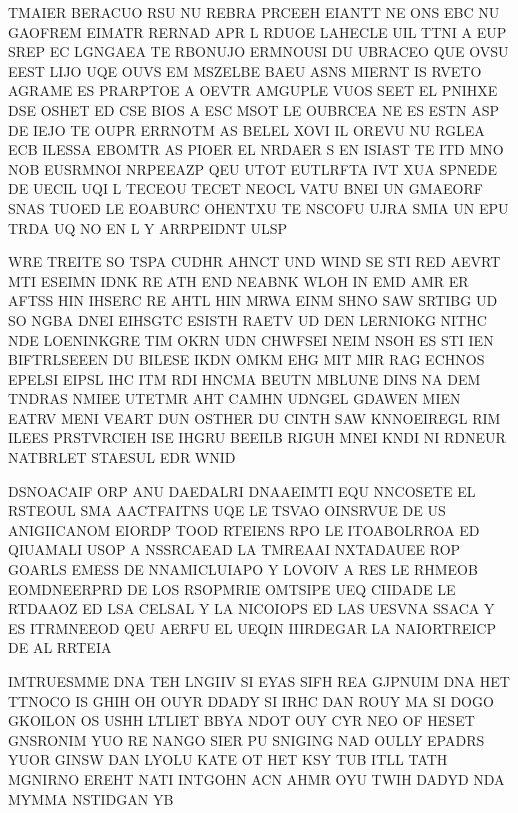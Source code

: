 \documentclass[11pt,class=report,crop=false]{standalone}
\begin{document}
\begin{activite}
\begin{enumerate}
{\small
\begin{center}
TMAIER BERACUO RSU NU REBRA PRCEEH EIANTT NE ONS EBC NU GAOFREM EIMATR RERNAD APR L RDUOE LAHECLE UIL TTNI A EUP SREP EC LGNGAEA TE RBONUJO ERMNOUSI DU UBRACEO QUE OVSU EEST LIJO UQE OUVS EM MSZELBE BAEU ASNS MIERNT IS RVETO AGRAME ES PRARPTOE A OEVTR AMGUPLE VUOS SEET EL PNIHXE DSE OSHET ED CSE BIOS A ESC MSOT LE OUBRCEA NE ES ESTN ASP DE IEJO TE OUPR ERRNOTM AS BELEL XOVI IL OREVU NU RGLEA ECB ILESSA EBOMTR AS PIOER EL NRDAER S EN ISIAST TE ITD MNO NOB EUSRMNOI NRPEEAZP QEU UTOT EUTLRFTA IVT XUA SPNEDE DE UECIL UQI L TECEOU TECET NEOCL VATU BNEI UN GMAEORF SNAS TUOED LE EOABURC OHENTXU TE NSCOFU UJRA SMIA UN EPU TRDA UQ NO EN L Y ARRPEIDNT ULSP
\end{center}

\begin{center}
WRE TREITE SO TSPA CUDHR AHNCT UND WIND SE STI RED AEVRT MTI ESEIMN IDNK RE ATH END NEABNK WLOH IN EMD AMR ER AFTSS HIN IHSERC RE AHTL HIN MRWA EINM SHNO SAW SRTIBG UD SO NGBA DNEI EIHSGTC ESISTH RAETV UD DEN LERNIOKG NITHC NDE LOENINKGRE TIM OKRN UDN CHWFSEI NEIM NSOH ES STI IEN BIFTRLSEEEN DU BILESE IKDN OMKM EHG MIT MIR RAG ECHNOS EPELSI EIPSL IHC ITM RDI HNCMA BEUTN MBLUNE DINS NA DEM TNDRAS NMIEE UTETMR AHT CAMHN UDNGEL GDAWEN MIEN EATRV MENI VEART DUN OSTHER DU CINTH SAW KNNOEIREGL RIM ILEES PRSTVRCIEH ISE IHGRU BEEILB RIGUH MNEI KNDI NI RDNEUR NATBRLET STAESUL EDR WNID
\end{center}

\begin{center}
DSNOACAIF ORP ANU DAEDALRI DNAAEIMTI EQU NNCOSETE EL RSTEOUL SMA AACTFAITNS UQE LE TSVAO OINSRVUE DE US ANIGIICANOM EIORDP TOOD RTEIENS RPO LE ITOABOLRROA ED QIUAMALI USOP A NSSRCAEAD LA TMREAAI NXTADAUEE ROP GOARLS EMESS DE NNAMICLUIAPO Y LOVOIV A RES LE RHMEOB EOMDNEERPRD DE LOS RSOPMRIE OMTSIPE UEQ CIIDADE LE RTDAAOZ ED LSA CELSAL Y LA NICOIOPS ED LAS UESVNA SSACA Y ES ITRMNEEOD QEU AERFU EL UEQIN IIIRDEGAR LA NAIORTREICP DE AL RRTEIA
\end{center}

\begin{center}
IMTRUESMME DNA TEH LNGIIV SI EYAS SIFH REA GJPNUIM DNA HET TTNOCO IS GHIH OH OUYR DDADY SI IRHC DAN ROUY MA SI DOGO GKOILON OS USHH LTLIET BBYA NDOT OUY CYR NEO OF HESET GNSRONIM YUO RE NANGO SIER PU SNIGING NAD OULLY EPADRS YUOR GINSW DAN LYOLU KATE OT HET KSY TUB ITLL TATH MGNIRNO EREHT NATI INTGOHN ACN AHMR OYU TWIH DADYD NDA MYMMA NSTIDGAN YB
\end{center}
}
\end{enumerate}

\end{activite}
\end{document}
